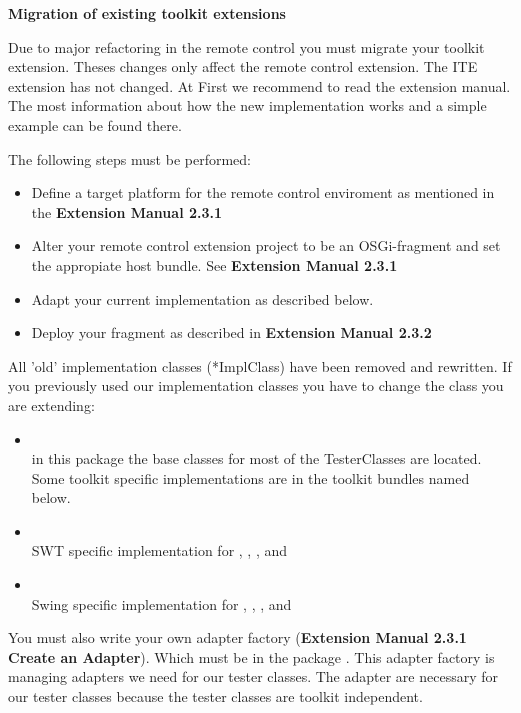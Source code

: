 \textbf{Migration of existing toolkit extensions}

Due to major refactoring in the remote control you must migrate your toolkit extension. Theses changes only affect the remote control extension. The ITE extension has not changed.
At First we recommend to read the extension manual. The most information about how the new implementation works and a simple example can be found there.

The following steps must be performed:
\begin{itemize}
\item Define a target platform for the remote control enviroment as mentioned in the \textbf{Extension Manual 2.3.1}
\item Alter your remote control extension project to be an OSGi-fragment and set the appropiate host bundle. See \textbf{Extension Manual 2.3.1}
\item Adapt your current implementation as described below.
\item Deploy your fragment as described in \textbf{Extension Manual 2.3.2}
\end{itemize}
All 'old' implementation classes (*ImplClass) have been removed and rewritten. If you previously used our implementation classes  you
have to change the class you are extending:
\begin{itemize}
\item {}\\ in this package the base classes for most of the
  TesterClasses are located. Some toolkit specific implementations are in the toolkit bundles named below.
\item {}\\ SWT specific implementation for , , ,  and 
\item {}\\ Swing specific implementation for , , ,  and 
\end{itemize}

You must also write your own adapter factory (\textbf{Extension Manual 2.3.1 Create an Adapter}). Which must be in the package .
This adapter factory is managing adapters we need for our tester classes. The adapter are necessary for our tester classes because the tester classes are toolkit independent.

